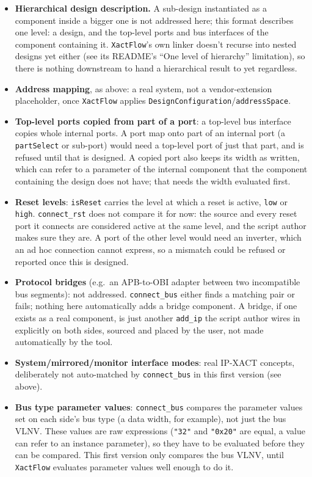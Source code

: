 \documentclass[11pt]{article}
\newcommand{\code}[1]{\texttt{#1}}
\begin{document}
\begin{itemize}
    \item \textbf{Hierarchical design description.} A sub-design instantiated as a
    component inside a bigger one is not addressed here; this format describes one level:
    a design, and the top-level ports and bus interfaces of the component containing it.
    \code{XactFlow}'s own linker doesn't recurse into nested
    designs yet either (see its README's ``One level of hierarchy''
    limitation), so there is nothing downstream to hand a hierarchical result to yet
    regardless.
    \item \textbf{Address mapping}, as above: a real system, not a vendor-extension
    placeholder, once \code{XactFlow} applies
    \code{DesignConfiguration}/\code{addressSpace}.
    \item \textbf{Top-level ports copied from part of a port}: a top-level bus interface
    copies whole internal ports. A port map onto part of an internal port (a
    \code{partSelect} or sub-port) would need a top-level port of just that part, and is
    refused until that is designed. A copied port also keeps its width as written, which
    can refer to a parameter of the internal component that the component containing the
    design does not have; that needs the width evaluated first.
    \item \textbf{Reset levels}: \code{isReset} carries the level at which a reset is
    active, \code{low} or \code{high}. \code{connect\_rst} does not compare it for now:
    the source and every reset port it connects are considered active at the same level,
    and the script author makes sure they are. A port of the other level would need an
    inverter, which an ad hoc connection cannot express, so a mismatch could be refused
    or reported once this is designed.
    \item \textbf{Protocol bridges} (e.g.\ an APB-to-OBI adapter between two incompatible
    bus segments): not addressed. \code{connect\_bus} either finds a matching pair or
    fails; nothing here automatically adds a bridge component. A bridge, if one exists as
    a real component, is just another \code{add\_ip} the script author wires in
    explicitly on both sides, sourced and placed by the user, not made automatically by
    the tool.
    \item \textbf{System/mirrored/monitor interface modes}: real IP-XACT concepts,
    deliberately not auto-matched by \code{connect\_bus} in this first version (see
    above).
    \item \textbf{Bus type parameter values}: \code{connect\_bus} compares the parameter
    values set on each side's bus type (a data width, for example), not just the bus VLNV.
    These values are raw expressions (\code{"32"} and \code{"0x20"} are equal, a value can
    refer to an instance parameter), so they have to be evaluated before they can be
    compared. This first version only compares the bus VLNV, until \code{XactFlow}
    evaluates parameter values well enough to do it.
\end{itemize}
\end{document}

